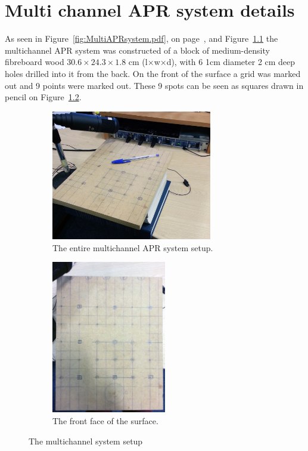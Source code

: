 \chapter{Multi channel APR system details}\label{ap:MultiAPRsystem}

\ifpdf
    \graphicspath{{Appendices/AppendixMultiAPRsystem/Photos/}{Appendices/AppendixMultiAPRsystem/Figs/}}
\else
\fi

As seen in Figure~\ref{fig:MultiAPRsystem.pdf}, on page~\pageref{fig:MultiAPRsystem.pdf}, and Figure~\ref{fig:wholesystem} the multichannel APR system was constructed of a block of medium-density fibreboard wood $30.6 \times 24.3 \times 1.8$ cm (l$\times$w$\times$d), with 6 1cm diameter 2 cm deep holes drilled into it from the back. On the front of the surface a grid was marked out and 9 points were marked out. These 9 spots can be seen as squares drawn in pencil on Figure~\ref{fig:frontfacesurface}.
\begin{figure}[b!]
\centering
\begin{subfigure}{.5\textwidth}
  \centering
  \includegraphics[width=7cm]{wholesystem}
  \caption{The entire multichannel APR system setup.}
  \label{fig:wholesystem}
\end{subfigure}%
\begin{subfigure}{.5\textwidth}
  \centering
  \includegraphics[width=5cm]{surface}
  \caption{The front face of the surface.}
  \label{fig:frontfacesurface}
\end{subfigure}
\caption{The multichannel system setup}
\label{fig:multiAPRsystemwhole}
\end{figure}

